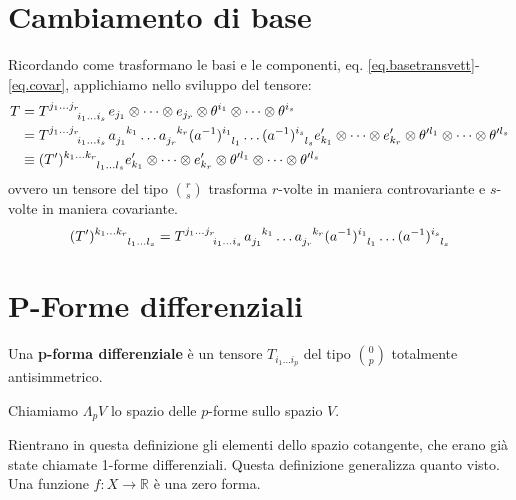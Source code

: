\section{Cambiamento di base}
Ricordando come trasformano le basi e le componenti, eq. \ref{eq.basetransvett}-\ref{eq.covar}, applichiamo nello sviluppo del tensore:
\begin{align*}
    T &= \tensor{T}{^{j_1 \dots j_r}_{i_1 \dots i_s}} e_{j_1} \otimes \dots \otimes e_{j_r} \otimes \theta^{i_1} \otimes \dots \otimes \theta^{i_s} \\
    &= \tensor{T}{^{j_1 \dots j_r}_{i_1 \dots i_s}} \tensor{a}{_{j_1}^{k_1}} \dots \tensor{a}{_{j_r}^{k_r}} \tensor{(a^{-1})}{^{i_1}_{l_1}} \dots \tensor{(a^{-1})}{^{i_s}_{l_s}} e'_{k_1} \otimes \dots \otimes e'_{k_r} \otimes \theta'^{l_1} \otimes \dots \otimes \theta'^{l_s} \\
    &\equiv \tensor{(T')}{^{k_1 \dots k_r} _{l_1 \dots l_s}}  e'_{k_1} \otimes \dots \otimes e'_{k_r} \otimes \theta'^{l_1} \otimes \dots \otimes \theta'^{l_s}
\end{align*}
ovvero un tensore del tipo $\binom{r}{s}$ trasforma $r$-volte in maniera controvariante e $s$-volte in maniera covariante.
\begin{equation*}
    \tensor{(T')}{^{k_1\dots k_r}_{l_1\dots l_s}} = \tensor{T}{^{j_1 \dots j_r}_{i_1 \dots i_s}} \tensor{a}{_{j_1}^{k_1}} \dots \tensor{a}{_{j_r}^{k_r}} \tensor{(a^{-1})}{^{i_1}_{l_1}} \dots \tensor{(a^{-1})}{^{i_s}_{l_s}}
\end{equation*}
\section{P-Forme differenziali}
\begin{definizione}
Una \textbf{p-forma differenziale} è un tensore $T_{i_1 \dots i_p}$ del tipo $\binom{0}{p}$ totalmente antisimmetrico.

Chiamiamo $\Lambda_p V$ lo spazio delle $p$-forme sullo spazio $V$.
\end{definizione}

Rientrano in questa definizione gli elementi dello spazio cotangente, che erano già state chiamate 1-forme differenziali. Questa definizione generalizza quanto visto.
Una funzione $f: X \rightarrow \mathbb{R}$ è una zero forma.

